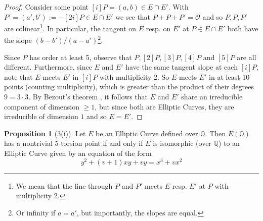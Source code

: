 \documentclass{scrartcl}
\newcommand{\Q}{\mathbb{Q}}
\renewcommand{\O}{\mathcal{O}}
\theoremstyle{definition}
\newtheorem{prop}[subsection]{Proposition}
\begin{document}
\begin{proof}
    Consider some point $[i] P = (a, b) \in E \cap E'$.
    With $P' = (a', b') := -[2i] P \in E \cap E'$ we see that $P + P + P' = \O$ and so $P, P, P'$ are colinear\footnote{We mean that the line through $P$ and $P'$ meets $E$ resp. $E'$ at $P$ with multiplicity 2.}.
    In particular, the tangent on $E$ resp. on $E'$ at $P \in E \cap E'$ both have the slope $(b - b')/(a - a')$\footnote{Or infinity if $a = a'$, but importantly, the slopes are equal.}.

    Since $P$ has order at least 5, observe that $P, [2]P, [3]P, [4]P$ and $[5]P$ are all different.
    Furthermore, since $E$ and $E'$ have the same tangent slope at each $[i] P$, note that $E$ meets $E'$ in $[i] P$ with multiplicity 2.
    So $E$ meets $E'$ in at least 10 points (counting multiplicity), which is greater than the product of their degrees $9 = 3 \cdot 3$.
    By Bezout's theorem \cite[Corollary I.7.8]{hartshorne}, it follows that $E$ and $E'$ share an irreducible component of dimension $\geq 1$, but since both are Elliptic Curves, they are irreducible of dimension $1$ and so $E = E'$.
\end{proof}
\begin{prop}[3(i)]
    Let $E$ be an Elliptic Curve defined over $\Q$.
    Then $E(\Q)$ has a nontrivial 5-torsion point if and only if $E$ is isomorphic (over $\Q$) to an Elliptic Curve given by an equation of the form
    \begin{equation*}
        y^2 + (v + 1)x y + v y = x^3 + v x^2
    \end{equation*}
\end{prop}
\end{document}
